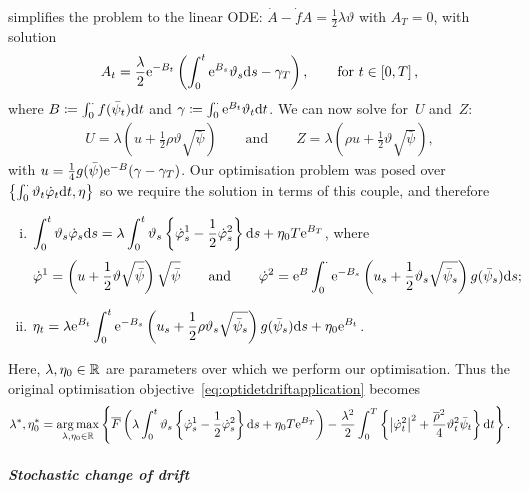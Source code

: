 simplifies the problem to the linear ODE:
$\dot{A}- \dot{f}A = \frac{1}{2}\lambda\vartheta$ with $A_T = 0$,
with solution
\[
A_t = \frac{\lambda}{2} \mathrm{e}^{-B_t}\left( \int_0^t \mathrm{e}^{B_s} \vartheta_s \mathrm{d} s - \gamma_T \right),
\qquad \text{for } t\in[0,T]\,,
\]
where $B\coloneqq\int_0^\cdot f(\bar\psi_t)\mathrm{d} t$ and $\gamma \coloneqq \int_0^\cdot \mathrm{e}^{B_t}\vartheta_t \mathrm{d} t$. 
We can now solve for~$U$ and~$Z$:
\begin{align*}
U = \lambda\left( u + \frac{1}{2}\rho\vartheta\sqrt{\bar\psi} \right)
\qquad \text{and} \qquad
Z = \lambda\left ( \rho u + \frac{1}{2}\vartheta\sqrt{\bar\psi} \right),
\end{align*}
with $u = \frac{1}{4}g(\bar\psi)\mathrm{e}^{-B}(\gamma-\gamma_T)$. Our optimisation problem was posed over $\left \{\int_0^\cdot \vartheta_t \dot{\varphi}_t \mathrm{d} t, \eta\right \}$ so we require the solution in terms of this couple, and therefore
\begin{enumerate}[(i)]
\item 
$\displaystyle
\int_0^t \vartheta_s \dot{\varphi}_s \mathrm{d} s = \lambda\int_0^t \vartheta_s \left \{ \dot{\varphi}^1_s - \frac{1}{2}\dot{\varphi}^2_s \right \}\mathrm{d} s + \eta_0 T \mathrm{e}^{B_T}$,
where
$$
\dot{\varphi}^1 = \left(u+ \frac{1}{2}\vartheta \sqrt{\bar\psi}\right)\sqrt{\bar\psi}
\qquad\text{and}\qquad
\dot{\varphi}^2 = \mathrm{e}^B \int_0^\cdot \mathrm{e}^{-B_s}\left( u_s + \frac{1}{2}\vartheta_s\sqrt{\bar\psi_s} \right )g(\bar\psi_s)\mathrm{d} s;
$$
\item 
$\displaystyle \eta_t = \lambda \mathrm{e}^{B_t} \int_0^t \mathrm{e}^{-B_s}\left( u_s + \frac{1}{2}\rho\vartheta_s\sqrt{\bar\psi_s} \right )g(\bar\psi_s)\mathrm{d} s + \eta_0 \mathrm{e}^{B_t}$.
\end{enumerate}
Here, $\lambda,\eta_0\in\mathbb{R}$ are parameters over which we perform our optimisation. 
Thus the original optimisation objective~\eqref{eq:optidetdriftapplication} becomes 
\begin{align*}
\lambda^{*}, \eta_0^{*} = \operatorname*{arg\,max}_{\lambda,\eta_0\in\mathbb{R}}
\left\{\overline{F}\left( \lambda\int_0^t \vartheta_s \left \{ \dot{\varphi}^1_s - \frac{1}{2}\dot{\varphi}^2_s \right \}\mathrm{d} s + \eta_0 T \mathrm{e}^{B_T} \right ) - \frac{\lambda^2}{2}\int_0^T\left\{ \big| \dot{\varphi}^2_t \big|^2 + \frac{\overline{\rho}^2}{4}\vartheta_t^2\bar\psi_t \right\}\mathrm{d} t\right\}.
\end{align*}

\paragraph{\textit{Stochastic change of drift}}

